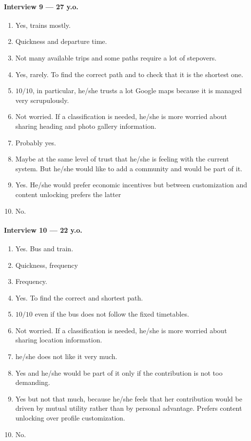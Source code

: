 \documentclass[a4paper, 11pt, twocolumn]{article}
\begin{document}
\paragraph*{Interview 9 --- 27 y.o.}

\begin{enumerate}
	\item Yes, trains mostly.
	\item Quickness and departure time.
	\item Not many available trips and some paths require a lot of stepovers.
	\item Yes, rarely. To find the correct path and to check that it is the shortest one.
	\item $10/10$, in particular, he/she trusts a lot Google maps because it is managed very scrupulously.
	\item Not worried. If a classification is needed, he/she is more worried about sharing heading and photo gallery information.
	\item Probably yes.
	\item Maybe at the same level of trust that he/she is feeling with the current system. But he/she would like to add a community and would be part of it.
	\item Yes. He/she would prefer economic incentives but between customization and content unlocking prefers the latter
	\item No.
\end{enumerate}

\paragraph*{Interview 10 --- 22 y.o.}
\begin{enumerate}
	\item Yes. Bus and train.
	\item Quickness, frequency
	\item Frequency.
	\item Yes. To find the correct and shortest path.
	\item $10/10$ even if the bus does not follow the fixed timetables.
	\item Not worried.  If a classification is needed, he/she is more worried about sharing location information.
	\item he/she does not like it very much.
	\item Yes and he/she would be part of it only if the contribution is not too demanding.
	\item Yes but not that much, because he/she feels that her contribution would be driven by mutual utility rather than by personal advantage. Prefers content unlocking over profile customization.
	\item No.
\end{enumerate}
\end{document}

